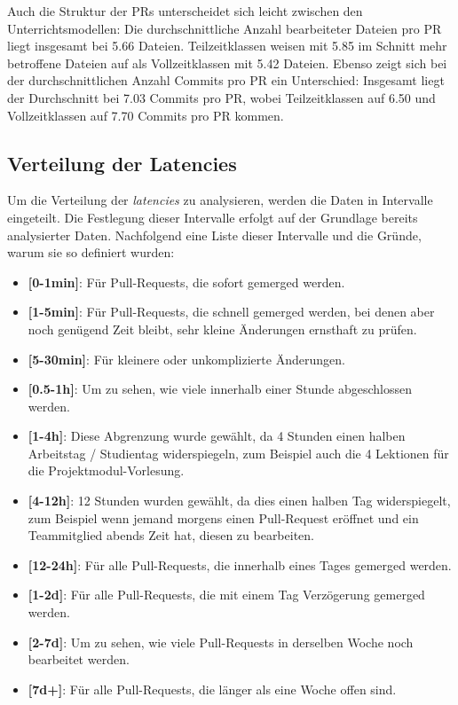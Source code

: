 Auch die Struktur der PRs unterscheidet sich leicht zwischen den Unterrichtsmodellen: Die durchschnittliche Anzahl bearbeiteter Dateien pro PR liegt insgesamt bei 5.66 Dateien. Teilzeitklassen weisen mit 5.85 im Schnitt mehr betroffene Dateien auf als Vollzeitklassen mit 5.42 Dateien. Ebenso zeigt sich bei der durchschnittlichen Anzahl Commits pro PR ein Unterschied: Insgesamt liegt der Durchschnitt bei 7.03 Commits pro PR, wobei Teilzeitklassen auf 6.50 und Vollzeitklassen auf 7.70 Commits pro PR kommen.

\subsection{Verteilung der Latencies}
Um die Verteilung der \textit{latencies} zu analysieren, werden die Daten in Intervalle eingeteilt. Die Festlegung dieser Intervalle erfolgt auf der Grundlage bereits analysierter Daten. Nachfolgend eine Liste dieser Intervalle und die Gründe, warum sie so definiert wurden: 

\begin{itemize}
    \item \textbf{[0-1min]}: Für Pull-Requests, die sofort gemerged werden.
    \item \textbf{[1-5min]}: Für Pull-Requests, die schnell gemerged werden, bei denen aber noch genügend Zeit bleibt, sehr kleine Änderungen ernsthaft zu prüfen.
    \item \textbf{[5-30min]}: Für kleinere oder unkomplizierte Änderungen.
    \item \textbf{[0.5-1h]}: Um zu sehen, wie viele innerhalb einer Stunde abgeschlossen werden.
    \item \textbf{[1-4h]}: Diese Abgrenzung wurde gewählt, da 4 Stunden einen halben Arbeitstag / Studientag widerspiegeln, zum Beispiel auch die 4 Lektionen für die Projektmodul-Vorlesung.
    \item \textbf{[4-12h]}: 12 Stunden wurden gewählt, da dies einen halben Tag widerspiegelt, zum Beispiel wenn jemand morgens einen Pull-Request eröffnet und ein Teammitglied abends Zeit hat, diesen zu bearbeiten.
    \item \textbf{[12-24h]}: Für alle Pull-Requests, die innerhalb eines Tages gemerged werden.
    \item \textbf{[1-2d]}: Für alle Pull-Requests, die mit einem Tag Verzögerung gemerged werden.
    \item \textbf{[2-7d]}: Um zu sehen, wie viele Pull-Requests in derselben Woche noch bearbeitet werden.
    \item \textbf{[7d+]}: Für alle Pull-Requests, die länger als eine Woche offen sind.
\end{itemize}


